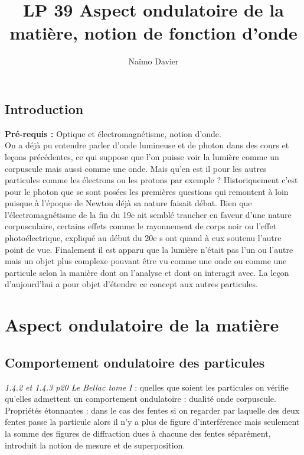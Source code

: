 \documentclass[12pt,prb,aps,epsf]{report}
\begin{document}
	
	\title{LP 39 Aspect ondulatoire de la matière, notion de fonction d'onde}
	\author{Naïmo Davier}
	
	\maketitle
	
	\tableofcontents
	
	\pagebreak
	
	
\subsection{Introduction}
\textbf{Pré-requis :} Optique et électromagnétisme, notion d'onde.\\

On a déjà pu entendre parler d'onde lumineuse et de photon dans des cours et leçons précédentes, ce qui suppose que l'on puisse voir la lumière comme un corpuscule mais aussi comme une onde. Mais qu'en est il pour les autres particules comme les électrons ou les protons par exemple ? Historiquement c'est pour le photon que se sont posées les premières questions qui remontent à loin puisque à l'époque de Newton déjà sa nature faisait débat. Bien que l'électromagnétisme de la fin du 19e ait semblé trancher en faveur d'une nature corpusculaire, certains effets comme le rayonnement de corps noir ou l'effet photoélectrique, expliqué au début du 20e s ont quand à eux soutenu l'autre point de vue. Finalement il est apparu que la lumière n'était pas l'un ou l'autre mais un objet plus complexe pouvant être vu comme une onde ou comme une particule selon la manière dont on l'analyse et dont on interagit avec. La leçon d'aujourd'hui a pour objet d'étendre ce concept aux autres particules.

\section{Aspect ondulatoire de la matière}
\subsection{Comportement ondulatoire des particules}
\textit{1.4.2 et 1.4.3 p20 Le Bellac tome I} : quelles que soient les particules on vérifie qu'elles admettent un comportement ondulatoire : dualité onde corpuscule. Propriétés étonnantes : dans le cas des fentes si on regarder par laquelle des deux fentes passe la particule alors il n'y a plus de figure d'interférence mais seulement la somme des figures de diffraction dues à chacune des fentes séparément, introduit la notion de mesure et de superposition.
\end{document}
